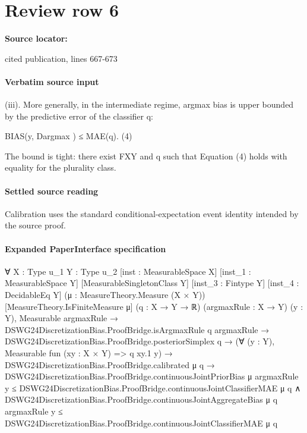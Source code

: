 \documentclass[10pt]{article}
\begin{document}
\section*{Review row 6}
\textbf{Source locator:} {\footnotesize\raggedright cited publication, lines 667-\allowbreak{}673\par}
\paragraph{Verbatim source input}
\begin{ReviewVerbatim}
(iii). More generally, in the intermediate regime, argmax bias is upper bounded by the predictive error of
        the classifier q:

                                                                                                   BIAS(y, Dargmax ) ≤ MAE(q).                                                         (4)

       The bound is tight: there exist FXY and q such that Equation (4) holds with equality for the plurality
       class.
\end{ReviewVerbatim}

\paragraph{Settled source reading}
\begin{sloppypar}
Calibration uses the standard conditional-\allowbreak{}expectation event identity intended by the source proof.\allowbreak{}
\end{sloppypar}

\paragraph{Expanded PaperInterface specification}
\begin{ReviewVerbatim}
∀ {X : Type u_1} {Y : Type u_2} [inst : MeasurableSpace X] [inst_1 : MeasurableSpace Y] [MeasurableSingletonClass Y]
  [inst_3 : Fintype Y] [inst_4 : DecidableEq Y] (μ : MeasureTheory.Measure (X × Y)) [MeasureTheory.IsFiniteMeasure μ]
  (q : X → Y → ℝ) (argmaxRule : X → Y) (y : Y),
  Measurable argmaxRule →
    DSWG24DiscretizationBias.ProofBridge.isArgmaxRule q argmaxRule →
      DSWG24DiscretizationBias.ProofBridge.posteriorSimplex q →
        (∀ (y : Y), Measurable fun (xy : X × Y) => q xy.1 y) →
          DSWG24DiscretizationBias.ProofBridge.calibrated μ q →
            DSWG24DiscretizationBias.ProofBridge.continuousJointPriorBias μ argmaxRule y ≤
                DSWG24DiscretizationBias.ProofBridge.continuousJointClassifierMAE μ q ∧
              DSWG24DiscretizationBias.ProofBridge.continuousJointAggregateBias μ q argmaxRule y ≤
                DSWG24DiscretizationBias.ProofBridge.continuousJointClassifierMAE μ q
\end{ReviewVerbatim}
\end{document}
